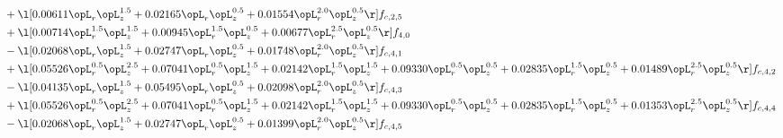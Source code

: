 \begin{alignat}{2}
& + \l[  0.00611 \opL_r \opL_z^{1.5} +  0.02165 \opL_r \opL_z^{0.5} +  0.01554 \opL_r^{2.0} \opL_z^{0.5}  \r] f_{c,2,5} \nonumber \\ 
& + \l[  0.00714 \opL_r^{1.5} \opL_z^{1.5} +  0.00945 \opL_r^{1.5} \opL_z^{0.5} +  0.00677 \opL_r^{2.5} \opL_z^{0.5}  \r] f_{4,0} \nonumber \\ 
& - \l[  0.02068 \opL_r \opL_z^{1.5} +  0.02747 \opL_r \opL_z^{0.5} +  0.01748 \opL_r^{2.0} \opL_z^{0.5}  \r] f_{c,4,1} \nonumber \\ 
& + \l[  0.05526 \opL_r^{0.5} \opL_z^{2.5} +  0.07041 \opL_r^{0.5} \opL_z^{1.5} +  0.02142 \opL_r^{1.5} \opL_z^{1.5} +  0.09330 \opL_r^{0.5} \opL_z^{0.5} +  0.02835 \opL_r^{1.5} \opL_z^{0.5} +  0.01489 \opL_r^{2.5} \opL_z^{0.5}  \r] f_{c,4,2} \nonumber \\ 
& - \l[  0.04135 \opL_r \opL_z^{1.5} +  0.05495 \opL_r \opL_z^{0.5} +  0.02098 \opL_r^{2.0} \opL_z^{0.5}  \r] f_{c,4,3} \nonumber \\ 
& + \l[  0.05526 \opL_r^{0.5} \opL_z^{2.5} +  0.07041 \opL_r^{0.5} \opL_z^{1.5} +  0.02142 \opL_r^{1.5} \opL_z^{1.5} +  0.09330 \opL_r^{0.5} \opL_z^{0.5} +  0.02835 \opL_r^{1.5} \opL_z^{0.5} +  0.01353 \opL_r^{2.5} \opL_z^{0.5}  \r] f_{c,4,4} \nonumber \\ 
& - \l[  0.02068 \opL_r \opL_z^{1.5} +  0.02747 \opL_r \opL_z^{0.5} +  0.01399 \opL_r^{2.0} \opL_z^{0.5}  \r] f_{c,4,5} \nonumber \\ 
\end{alignat} 


